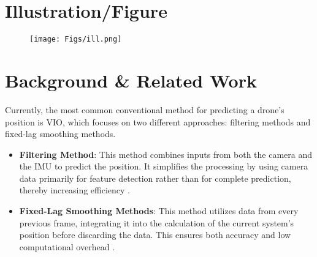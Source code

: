 \documentclass{article} %
\begin{document}
\section{Illustration/Figure}


\begin{figure}[H]
  \begin{center}
  \texttt{[image: Figs/ill.png]}
  \end{center}
\end{figure}

\section{Background \& Related Work}
Currently, the most common conventional method for predicting a drone's position is VIO, which focuses on two different approaches: filtering methods and fixed-lag smoothing methods.
\begin{itemize}
  \item \textbf{Filtering Method}: This method combines inputs from both the camera and the IMU to predict the position. It simplifies the processing by using camera data primarily for feature detection rather than for complete prediction, thereby increasing efficiency \citep{4209642}.
  \item \textbf{Fixed-Lag Smoothing Methods}: This method utilizes data from every previous frame, integrating it into the calculation of the current system’s position before discarding the data. This ensures both accuracy and low computational overhead \citep{Leutenegger2013KeyframeBasedVS}.
\end{itemize}
\end{document}
